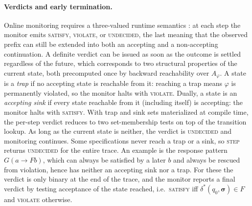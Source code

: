 
\paragraph{Verdicts and early termination.}
Online monitoring requires a three-valued runtime semantics \cite{monitorability_LTL}: at each step the monitor emits \textsc{satisfy}, \textsc{violate}, or \textsc{undecided}, the last meaning that the observed prefix can still be extended into both an accepting and a non-accepting continuation. A definite verdict can be issued as soon as the outcome is settled regardless of the future, which corresponds to two structural properties of the current state, both precomputed once by backward reachability over $A_\varphi$. A state is a \emph{trap} if no accepting state is reachable from it: reaching a trap means $\varphi$ is permanently violated, so the monitor halts with \textsc{violate}. Dually, a state is an \emph{accepting sink} if every state reachable from it (including itself) is accepting: the monitor halts with \textsc{satisfy}. With trap and sink sets materialized at compile time, the per-step verdict reduces to two set-membership tests on top of the transition lookup. As long as the current state is neither, the verdict is \textsc{undecided} and monitoring continues.
Some specifications never reach a trap or a sink, so \textsc{step} returns \textsc{undecided} for the entire trace. An example is the response pattern $G(a \rightarrow Fb)$, which can always be satisfied by a later $b$ and always be rescued from violation, hence has neither an accepting sink nor a trap. For these the verdict is only binary at the end of the trace, and the monitor reports a final verdict by testing acceptance of the state reached, i.e.\ \textsc{satisfy} iff $\delta^*(q_0, \boldsymbol{\sigma}) \in F$ and \textsc{violate} otherwise.